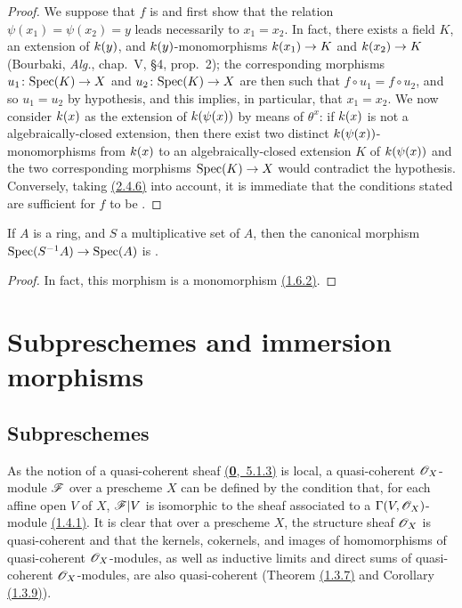 \begin{proof}
\label{proof-prop-1.3.5.8}
We suppose that $f$ is  and first show that the relation $\psi(x_1)=\psi(x_2)=y$ leads necessarily to $x_1=x_2$.
In fact, there exists a field $K$, an extension of $k(y)$, and $k(y)$-monomorphisms $k(x_1)\to K$ and $k(x_2)\to K$ (Bourbaki, \emph{Alg.}, chap.~V, §4, prop.~2); the corresponding morphisms $u_1\colon{\mathop{\mathrm{Spec}}\nolimits}(K)\to X$ and $u_2\colon{\mathop{\mathrm{Spec}}\nolimits}(K)\to X$ are then such that $f\circ u_1=f\circ u_2$, and so $u_1=u_2$ by hypothesis, and this implies, in particular, that $x_1=x_2$.
We now consider $k(x)$ as the extension of $k(\psi(x))$ by means of $\theta^x$: if $k(x)$ is not a  algebraically-closed extension, then there exist two distinct $k(\psi(x))$-monomorphisms from $k(x)$ to an algebraically-closed extension $K$ of $k(\psi(x))$ and the two corresponding morphisms ${\mathop{\mathrm{Spec}}\nolimits}(K)\to X$ would contradict the hypothesis.
Conversely, taking \hyperref[cor-1.2.4.6]{(2.4.6)} into account, it is immediate that the conditions stated are sufficient for $f$ to be .
\end{proof}

\begin{cor}[3.5.9]
\label{cor-1.3.5.9}
If $A$ is a ring, and $S$ a multiplicative set of $A$, then the canonical morphism ${\mathop{\mathrm{Spec}}\nolimits}(S^{-1}A)\to{\mathop{\mathrm{Spec}}\nolimits}(A)$ is .
\end{cor}

\begin{proof}
\label{proof-cor-1.3.5.9}
In fact, this morphism is a monomorphism \hyperref[exm-1.1.6.2]{(1.6.2)}.
\end{proof}

\section{Subpreschemes and immersion morphisms}
\label{section-subpreschemes-and-immersion-morphisms}

\subsection{Subpreschemes}
\label{subsection-subpreschemes}

\begin{env}[4.1.1]
\label{env-1.4.1.1}
As the notion of a quasi-coherent sheaf \hyperref[env-0.5.1.3]{(\textbf{0},~5.1.3)} is local,
a quasi-coherent $\mathscr{O}_X$-module $\mathscr{F}$ over a prescheme $X$ can be defined by the condition
that, for each affine open $V$ of $X$, $\mathscr{F}|V$ is isomorphic to the sheaf associated to a
$\Gamma(V,\mathscr{O}_X)$-module \hyperref[thm-1.1.4.1]{(1.4.1)}. It is clear that over a prescheme
$X$, the structure sheaf $\mathscr{O}_X$ is quasi-coherent and that the kernels, cokernels, and
images of homomorphisms of quasi-coherent $\mathscr{O}_X$-modules, as well as inductive limits and
direct sums of quasi-coherent $\mathscr{O}_X$-modules, are also quasi-coherent
(Theorem \hyperref[thm-1.1.3.7]{(1.3.7)} and Corollary \hyperref[cor-1.1.3.9]{(1.3.9)}).
\end{env}

